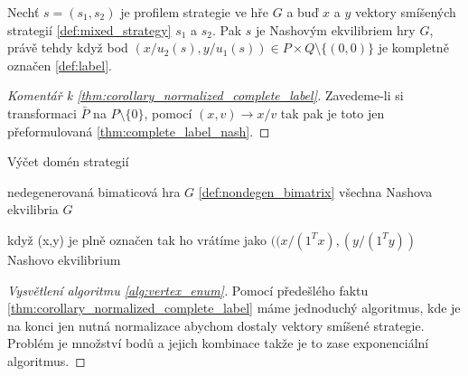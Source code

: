 \begin{theorem}
\label{thm:corollary_normalized_complete_label}
Nechť $s = (s_1, s_2)$ je profilem strategie ve hře $G$ a buď $x$ a  $y$ vektory smíšených strategií \ref{def:mixed_strategy} $s_1$ a $s_2$.
Pak $s$ je Nashovým ekvilibriem hry $G$, právě tehdy když bod $(x/u_2(s), y/u_1(s)) \in P \times Q \setminus \{(0,0)\}$ je kompletně označen \ref{def:label}.
\end{theorem}
\begin{proof}[Komentář k \ref{thm:corollary_normalized_complete_label}]
    Zavedeme-li si transformaci $\bar{P}$ na $P \setminus \{0\}$, pomocí $(x,v)\rightarrow x/v$ tak pak je toto jen přeformulovaná \ref{thm:complete_label_nash}. 
\end{proof}

\begin{algorithm}
    \algrenewcommand{}
    \algrenewcommand{}
    \caption{Výčet domén strategií}
    \label{alg:vertex_enum}
    \begin{algorithmic}
        \Require  nedegenerovaná bimaticová hra $G$ \ref{def:nondegen_bimatrix}
        \Ensure  všechna Nashova ekvilibria $G$
        
            \State když (x,y) je plně označen tak ho vrátíme jako $((x/(1^Tx),(y/(1^Ty))$ Nashovo ekvilibrium
        \EndFor
    \end{algorithmic}
\end{algorithm}

\begin{proof}[Vysvětlení algoritmu \ref{alg:vertex_enum}]
    Pomocí předešlého faktu \ref{thm:corollary_normalized_complete_label} máme jednoduchý algoritmus, kde je na konci jen nutná normalizace abychom dostaly vektory smíšené strategie.
    Problém je množství bodů a jejich kombinace takže je to zase exponenciální algoritmus. 
\end{proof}
